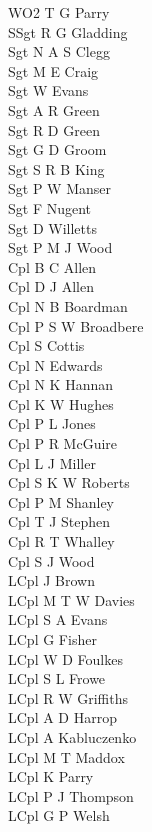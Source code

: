 \begin{multicols}{2}
  \noindent
  WO2 T G Parry \\
  SSgt R G Gladding \\
  Sgt N A S Clegg \\
  Sgt M E Craig \\
  Sgt W Evans \\
  Sgt A R Green \\
  Sgt R D Green \\
  Sgt G D Groom \\
  Sgt S R B King \\
  Sgt P W Manser \\
  Sgt F Nugent \\
  Sgt D Willetts \\
  Sgt P M J Wood \\
  Cpl B C Allen \\
  Cpl D J Allen \\
  Cpl N B Boardman \\
  Cpl P S W Broadbere \\
  Cpl S Cottis \\
  Cpl N Edwards \\
  Cpl N K Hannan \\
  Cpl K W Hughes \\
  Cpl P L Jones \\
  Cpl P R McGuire \\
  Cpl L J Miller \\
  Cpl S K W Roberts \\
  Cpl P M Shanley \\
  Cpl T J Stephen \\
  Cpl R T Whalley \\
  Cpl S J Wood \\
  LCpl J Brown \\
  LCpl M T W Davies \\
  LCpl S A Evans \\
  LCpl G Fisher \\
  LCpl W D Foulkes \\
  LCpl S L Frowe \\
  LCpl R W Griffiths \\
  LCpl A D Harrop \\
  LCpl A Kabluczenko \\
  LCpl M T Maddox \\
  LCpl K Parry \\
  LCpl P J Thompson \\
  LCpl G P Welsh \\

\end{multicols}
